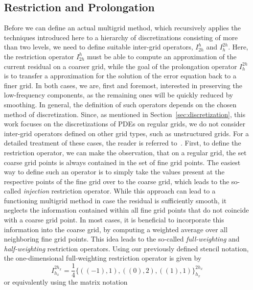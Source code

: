 \subsection{Restriction and Prolongation}
Before we can define an actual multigrid method, which recursively applies the techniques introduced here to a hierarchy of discretizations consisting of more than two levels, we need to define suitable inter-grid operators, $I_{2h}^{h}$ and $I_{h}^{2h}$.
Here, the restriction operator $I_{2h}^{h}$ must be able to compute an approximation of the current residual on a coarser grid, while the goal of the prolongation operator $I_{h}^{2h}$ is to transfer a approximation for the solution of the error equation back to a finer grid.
In both cases, we are, first and foremost, interested in preserving the low-frequency components, as the remaining ones will be quickly reduced by smoothing.
In general, the definition of such operators depends on the chosen method of discretization. 
Since, as mentioned in Section~\ref{sec:discretization}, this work focuses on the discretizations of PDEs on regular grids, we do not consider inter-grid operators defined on other grid types, such as unstructured grids.
For a detailed treatment of these cases, the reader is referred to~\cite{trottenberg2000multigrid,ruge1987algebraic,stuben2001introduction}.%
First, to define the restriction operator, we can make the observation, that on a regular grid, the set coarse grid points is always contained in the set of fine grid points.
The easiest way to define such an operator is to simply take the values present at the respective points of the fine grid over to the coarse grid, which leads to the so-called \emph{injection} restriction operator.
While this approach can lead to a functioning multigrid method in case the residual is sufficiently smooth, it neglects the information contained within all fine grid points that do not coincide with a coarse grid point.
In most cases, it is beneficial to incorporate this information into the coarse grid, by computing a weighted average over all neighboring fine grid points.
This idea leads to the so-called \emph{full-weighting} and \emph{half-weighting} restriction operators.
Using our previously defined stencil notation, the one-dimensional full-weighting restriction operator is given by
\begin{equation}
	I_{h_x}^{2 h_x} = \frac{1}{4}\{((-1), 1), ((0), 2), ((1), 1)\}_{h_x}^{2h_x}
\end{equation} 
or equivalently using the matrix notation
